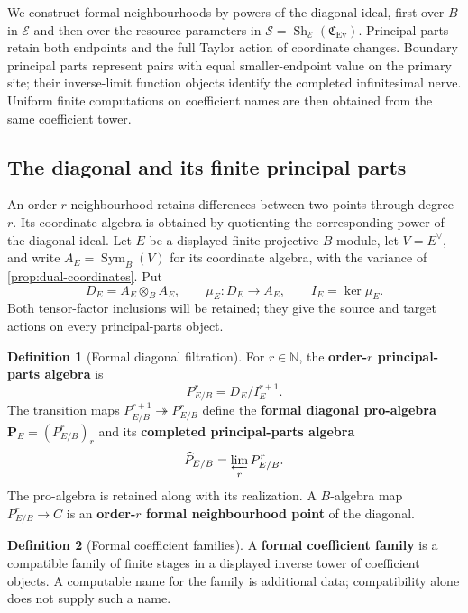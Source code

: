 \documentclass[11pt,a4paper]{article}
\numberwithin{algorithm}{section}
\numberwithin{equation}{section}
\theoremstyle{definition}
\newtheorem{definition}[definition]{Definition}
\theoremstyle{remark}
\theoremstyle{plain}
\newcommand{\E}{\mathcal E}
\newcommand{\N}{\mathbb N}
\newcommand{\onto}{\twoheadrightarrow}
\newcommand{\Sym}{\operatorname{Sym}}
\newcommand{\Ev}{{\operatorname{Ev}}}
\newcommand{\Cplx}{\mathfrak C_{\Ev}}
\newcommand{\Sh}{\operatorname{Sh}}
\theoremstyle{definition}
\theoremstyle{plain}
\begin{document}
We construct formal neighbourhoods by powers of the diagonal ideal,
first over $B$ in $\E$ and then over the resource parameters in
$\mathscr S=\Sh_\E(\Cplx)$. Principal parts retain both endpoints and
the full Taylor action of coordinate changes. Boundary principal parts
represent pairs with equal smaller-endpoint value on the primary site;
their inverse-limit function objects identify the completed infinitesimal
nerve. Uniform finite computations on coefficient names are
then obtained from the same coefficient tower.

\subsection{The diagonal and its finite principal parts}
\label{sec:formal-diagonal}
An order-$r$ neighbourhood retains differences between two points
through degree $r$. Its coordinate algebra is obtained by quotienting
the corresponding power of the diagonal ideal.
Let $E$ be a displayed finite-projective $B$-module, let $V=E^\vee$,
and write $A_E=\Sym_B(V)$ for its coordinate algebra, with the
variance of \cref{prop:dual-coordinates}. Put
\[
 D_E=A_E\otimes_BA_E,\qquad
 \mu_E:D_E\longrightarrow A_E,\qquad
 I_E=\ker\mu_E.
\]
Both tensor-factor inclusions will be retained; they give the source
and target actions on every principal-parts object.

\begin{definition}[Formal diagonal filtration]
\label{def:formal-principal-parts}
For $r\in\N$, the \textbf{order-$r$ principal-parts algebra} is
\[
 P^r_{E/B}=D_E/I_E^{r+1}.
\]
The transition maps $P^{r+1}_{E/B}\onto P^r_{E/B}$ define the
\textbf{formal diagonal pro-algebra} $\boldsymbol P_E=(P^r_{E/B})_r$
and its \textbf{completed principal-parts algebra}
\[
 \widehat P_{E/B}=\varprojlim_rP^r_{E/B}.
\]
The pro-algebra is retained along with its realization.  A
$B$-algebra map $P^r_{E/B}\to C$ is an \textbf{order-$r$ formal neighbourhood point} of the diagonal.
\end{definition}

\begin{definition}[Formal coefficient families]\label{def:formal-coefficient-families}
A \textbf{formal coefficient family} is a compatible family of finite
stages in a displayed inverse tower of coefficient objects. A computable
name for the family is additional data; compatibility alone does
not supply such a name.
\end{definition}
\end{document}
